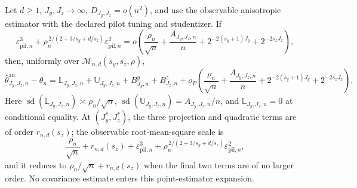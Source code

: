 Let \(d\ge1\), \(J_y,J_z\to\infty\), \(D_{J_y,J_z}=o(n^2)\), and use the observable anisotropic estimator with the declared pilot tuning and studentizer. If
\[
\varepsilon_{\mathrm{pil},n}^3+\rho_n^{\,2/(2+3/s_y+d/s_z)}\varepsilon_{\mathrm{pil},n}^2=o\!\left(\frac{\rho_n}{\sqrt n}+\frac{A_{J_y,J_z,n}}n+2^{-2(s_y+1)J_y}+2^{-2s_zJ_z}\right),
\]
then, uniformly over \(\mathcal M_{n,d}(s_y,s_z,\rho)\),
\[
\widehat\theta^{\mathrm{an}}_{J_y,J_z,n}-\theta_n=\mathbb L_{J_y,J_z,n}+\mathbb U_{J_y,J_z,n}+B^y_{J_y,n}+B^z_{J_z,n}+o_P\!\left(\frac{\rho_n}{\sqrt n}+\frac{A_{J_y,J_z,n}}n+2^{-2(s_y+1)J_y}+2^{-2s_zJ_z}\right).
\]
Here \(\operatorname{sd}(\mathbb L_{J_y,J_z,n})\asymp\rho_n/\sqrt n\), \(\operatorname{sd}(\mathbb U_{J_y,J_z,n})=A_{J_y,J_z,n}/n\), and \(\mathbb L_{J_y,J_z,n}=0\) at conditional equality. At \((J_y^*,J_z^*)\), the three projection and quadratic terms are of order \(r_{n,d}(s_z)\); the observable root-mean-square scale is
\[
\frac{\rho_n}{\sqrt n}+r_{n,d}(s_z)+\varepsilon_{\mathrm{pil},n}^3+\rho_n^{\,2/(2+3/s_y+d/s_z)}\varepsilon_{\mathrm{pil},n}^2,
\]
and it reduces to \(\rho_n/\sqrt n+r_{n,d}(s_z)\) when the final two terms are of no larger order. No covariance estimate enters this point-estimator expansion.